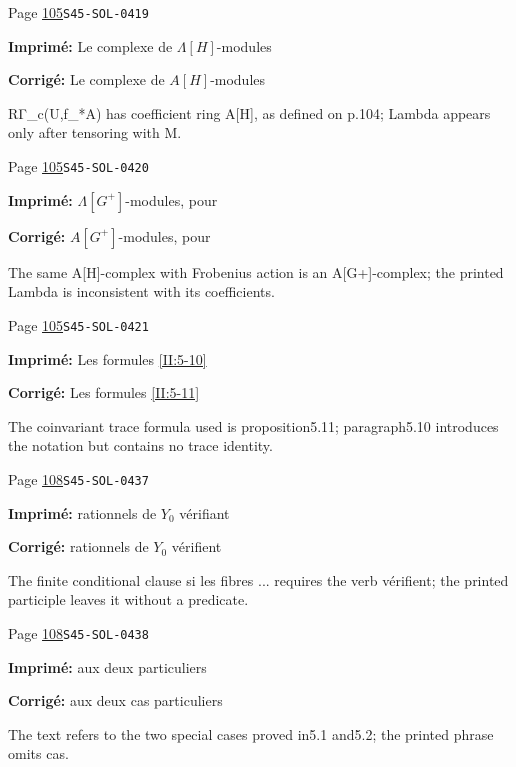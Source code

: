\begin{description}
\smallskip
\item[\hypertarget{apparatus:FR-0059}{59}] Page \hyperlink{printpage:fr:105}{105}\quad\texttt{S45-SOL-0419}
\par\noindent\textbf{Imprimé:} Le complexe de $\Lambda[H]$-modules
\par\noindent\textbf{Corrigé:} Le complexe de $A[H]$-modules
\par\noindent RΓ\_c(U,f\_*A) has coefficient ring A[H], as defined on p.104; Lambda appears only after tensoring with M.
\smallskip
\item[\hypertarget{apparatus:FR-0060}{60}] Page \hyperlink{printpage:fr:105}{105}\quad\texttt{S45-SOL-0420}
\par\noindent\textbf{Imprimé:} $\Lambda[G^+]$-modules, pour
\par\noindent\textbf{Corrigé:} $A[G^+]$-modules, pour
\par\noindent The same A[H]-complex with Frobenius action is an A[G+]-complex; the printed Lambda is inconsistent with its coefficients.
\smallskip
\item[\hypertarget{apparatus:FR-0061}{61}] Page \hyperlink{printpage:fr:105}{105}\quad\texttt{S45-SOL-0421}
\par\noindent\textbf{Imprimé:} Les formules \ref{II:5-10}
\par\noindent\textbf{Corrigé:} Les formules \ref{II:5-11}
\par\noindent The coinvariant trace formula used is proposition5.11; paragraph5.10 introduces the notation but contains no trace identity.
\smallskip
\item[\hypertarget{apparatus:FR-0062}{62}] Page \hyperlink{printpage:fr:108}{108}\quad\texttt{S45-SOL-0437}
\par\noindent\textbf{Imprimé:} rationnels de $Y_0$ vérifiant
\par\noindent\textbf{Corrigé:} rationnels de $Y_0$ vérifient
\par\noindent The finite conditional clause si les fibres ... requires the verb vérifient; the printed participle leaves it without a predicate.
\smallskip
\item[\hypertarget{apparatus:FR-0063}{63}] Page \hyperlink{printpage:fr:108}{108}\quad\texttt{S45-SOL-0438}
\par\noindent\textbf{Imprimé:} aux deux particuliers
\par\noindent\textbf{Corrigé:} aux deux cas particuliers
\par\noindent The text refers to the two special cases proved in5.1 and5.2; the printed phrase omits cas.

\end{description}
